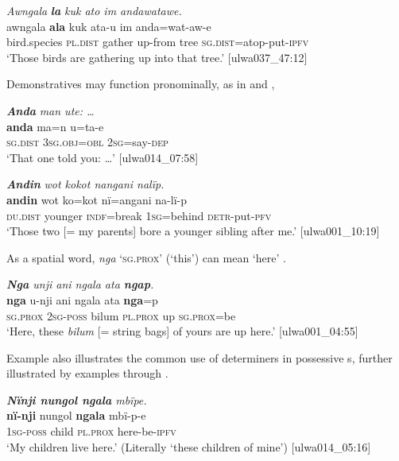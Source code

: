 \ea%
    \label{ex:det:86}
          \textit{Awngala} \textbf{\textit{la}} \textit{kuk ato im andawatawe.}\\
\gll    awngala  \textbf{ala}      kuk  ata-u    im anda=wat-aw-e\\
    bird.species    \textsc{pl.dist}  gather  up-from  tree  \textsc{sg.dist}=atop-put\textsc{{}-ipfv}\\
\glt `Those birds are gathering up into that tree.’ [ulwa037\_47:12]
\z

Demonstratives may function pronominally, as in  and ,

\ea%
    \label{ex:det:87}
          \textbf{\textit{Anda}} \textit{man ute: …}\\
\gll    \textbf{anda}    ma=n      u=ta-e\\
    \textsc{sg.dist}  \textsc{3sg.obj=obl}  \textsc{2sg=}say-\textsc{dep}\\
\glt `That one told you: …’ [ulwa014\_07:58]
\z

\ea%
    \label{ex:det:88}
          \textbf{\textit{Andin}} \textit{wot kokot nangani nalïp.}\\
\gll    \textbf{andin}    wot    ko=kot      nï=angani    na-lï-p\\
    \textsc{du.dist}  younger  \textsc{indf}=break  1\textsc{sg}=behind  \textsc{detr-}put-\textsc{pfv}\\
\glt `Those two [= my parents] bore a younger sibling after me.’ [ulwa001\_10:19]
\z

As a spatial  word, \textit{nga} ‘\textsc{sg.prox}’ (‘this’) can mean ‘here’ .

\ea%
    \label{ex:det:89}
          \textit{\textbf{Nga} unji ani ngala ata \textbf{ngap}.}\\
\gll    \textbf{nga}    u-nji    ani    ngala    ata  \textbf{nga}=p\\
    \textsc{sg.prox}  \textsc{2sg-poss}  bilum  \textsc{pl.prox}  up  \textsc{sg.prox}=be\\
\glt `Here, these \textit{bilum} [= string bags] of yours are up here.’ [ulwa001\_04:55]
\z

Example  also illustrates the common use of  determiners in  possessive s, further illustrated by examples  through .

\ea%
    \label{ex:det:90}
         \textit{\textbf{Nïnji nungol ngala} mbïpe.}\\
\gll    \textbf{nï-nji}    nungol  \textbf{ngala}    mbï-p-e\\
    1\textsc{sg-poss}  child  \textsc{pl.prox}  here-be-\textsc{ipfv}\\
\glt `My children live here.’ (Literally ‘these children of mine’) [ulwa014\_05:16]
\z

